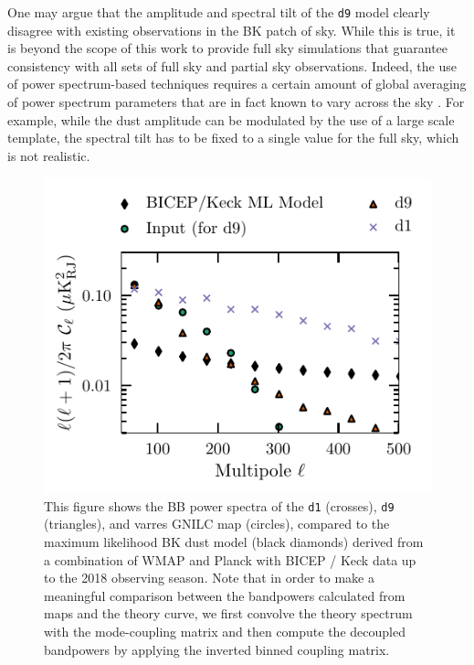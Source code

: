 \documentclass[twocolumn]{aastex631}
\newcommand{\done}{{\tt d1}}
\newcommand{\dnine}{{\tt d9}}
\begin{document}
One may argue that the amplitude and spectral tilt of the \dnine{} model clearly disagree with existing observations in the BK patch of sky. While this is true, it is beyond the scope of this work to provide full sky simulations that guarantee consistency with all sets of full sky and partial sky observations. Indeed, the use of power spectrum-based techniques requires a certain amount of global averaging of power spectrum parameters that are in fact known to vary across the sky \cite{planck2016-l04}. For example, while the dust amplitude can be modulated by the use of a large scale template, the spectral tilt has to be fixed to a single value for the full sky, which is not realistic. 

\begin{figure}[ht]
    \centering
    \includegraphics{paper_BK_patch.pdf}
    \caption{This figure shows the BB power spectra of the \done{} (crosses), \dnine{} (triangles), and varres GNILC map (circles), compared to the maximum likelihood BK dust model (black diamonds) derived from a combination of WMAP and Planck with BICEP / Keck data up to the 2018 observing season. Note that in order to make a meaningful comparison between the bandpowers calculated from maps and the theory curve, we first convolve the theory spectrum with the mode-coupling matrix and then compute the decoupled bandpowers by applying the inverted binned coupling matrix.}
    \label{fig:d1d9_bkpatch}
\end{figure}
\end{document}

